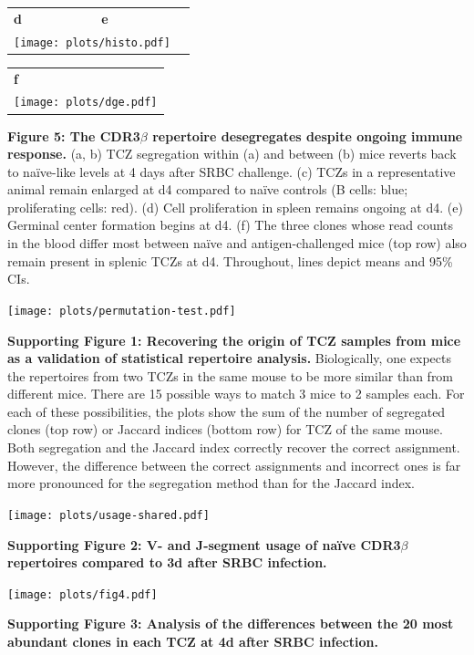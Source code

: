 \documentclass[a4paper]{article}
\newcommand{\s}[1]{{\bfseries\Large #1}}
\begin{document}
\begin{tabular}{lll}
	\s{d} \hspace{5cm} & \s{e} \\
	\multicolumn{2}{l}{\texttt{[image: plots/histo.pdf]}} & 
\end{tabular}

\begin{tabular}{l}
\s{f} \\
\texttt{[image: plots/dge.pdf]}
\end{tabular}


{\bfseries Figure 5: The CDR3$\beta$ repertoire desegregates despite ongoing immune response.} (a, b) TCZ segregation within (a) and between (b) mice reverts back to naïve-like levels at 4 days after SRBC challenge. (c) TCZs in a representative animal remain enlarged at d4 compared to naïve controls (B cells: blue; proliferating cells: red). (d) Cell proliferation in spleen remains ongoing at d4. (e) Germinal center formation begins at d4. (f) The three clones whose read counts in the blood differ most between na\"{i}ve and antigen-challenged mice (top row) also remain present in splenic TCZs at d4. Throughout, lines depict means and 95\% CIs.

\newpage



\newpage

\texttt{[image: plots/permutation-test.pdf]}

{\bfseries Supporting Figure 1: Recovering the origin of TCZ samples from mice as a validation of statistical repertoire analysis.} Biologically, one expects the repertoires from two TCZs in the same mouse to be more similar than from different mice. There are 15 possible ways to match 3 mice to 2 samples each. For each of these possibilities, the plots show the sum of the number of segregated clones (top row) or Jaccard indices (bottom row) for TCZ of the same mouse. Both segregation and the Jaccard index correctly recover the correct assignment. However, the difference between the correct assignments and incorrect ones is far more pronounced for the segregation method than for the Jaccard index.

\newpage


\texttt{[image: plots/usage-shared.pdf]}

{\bfseries Supporting Figure 2: V- and J-segment usage of naïve CDR3$\beta$ repertoires compared to 3d after SRBC infection.}

\newpage


\texttt{[image: plots/fig4.pdf]}

{\bfseries Supporting Figure 3: Analysis of the differences between the 20 most abundant clones in each TCZ at 4d after SRBC infection.}
\end{document}
